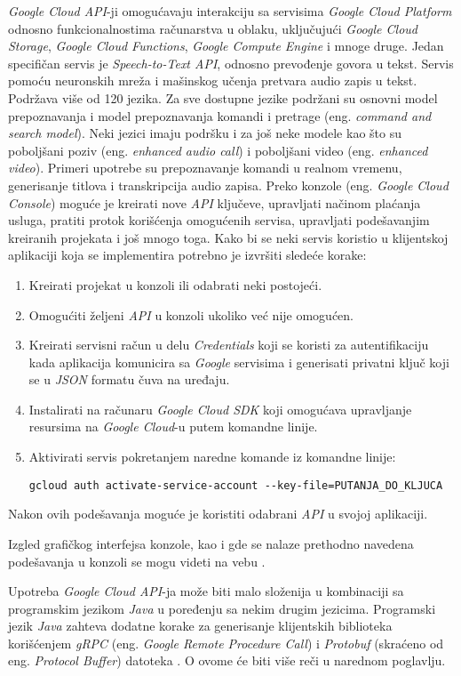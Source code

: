 \documentclass[android.tex]{subfiles}
\begin{document}
\textit{Google Cloud API}-ji omogućavaju interakciju sa servisima \textit{Google Cloud Platform} odnosno funkcionalnostima računarstva u oblaku, uključujući \textit{Google Cloud Storage}, \textit{Google Cloud Functions}, \textit{Google Compute Engine} i mnoge druge. Jedan specifičan servis je \textit{Speech-to-Text API}, odnosno prevođenje govora u tekst. Servis pomoću neuronskih mreža i mašinskog učenja pretvara audio zapis u tekst. Podržava više od 120 jezika. Za sve dostupne jezike podržani su osnovni model prepoznavanja i model prepoznavanja komandi i pretrage (eng. \textit{command and search model}). Neki jezici imaju podršku i za još neke modele kao što su poboljšani poziv (eng. \textit{enhanced audio call}) i poboljšani video (eng. \textit{enhanced video}). Primeri upotrebe su prepoznavanje komandi u realnom vremenu, generisanje titlova i transkripcija audio zapisa. Preko konzole (eng. \textit{Google Cloud Console}) moguće je kreirati nove \textit{API} ključeve, upravljati načinom plaćanja usluga, pratiti protok korišćenja omogućenih servisa, upravljati podešavanjim kreiranih projekata i još mnogo toga. Kako bi se neki servis koristio u klijentskoj aplikaciji koja se implementira potrebno je izvršiti sledeće korake: 
\begin{enumerate}
    \item Kreirati projekat u konzoli ili odabrati neki postojeći.
    \item Omogućiti željeni \textit{API} u konzoli ukoliko već nije omogućen. 
    \item Kreirati servisni račun u delu \textit{Credentials} koji se koristi za autentifikaciju kada aplikacija komunicira sa \textit{Google} servisima i generisati privatni ključ koji se u \textit{JSON} formatu čuva na uređaju.
    \item Instalirati na računaru \textit{Google Cloud SDK} koji omogućava upravljanje resursima na \textit{Google Cloud}-u putem komandne linije.
    \item Aktivirati servis pokretanjem naredne komande iz komandne linije:
    
    \verb|gcloud auth activate-service-account --key-file=PUTANJA_DO_KLJUCA|
\end{enumerate}
Nakon ovih podešavanja moguće je koristiti odabrani \textit{API} u svojoj aplikaciji.

Izgled grafičkog interfejsa  konzole, kao i gde se nalaze prethodno navedena podešavanja u konzoli se mogu videti na vebu \cite{sajt:googleConsole}.

Upotreba \textit{Google Cloud API}-ja može biti malo složenija u kombinaciji sa programskim jezikom \textit{Java} u poređenju sa nekim drugim jezicima. Programski jezik \textit{Java} zahteva dodatne korake za generisanje klijentskih biblioteka korišćenjem \textit{gRPC} (eng. \textit{Google Remote Procedure Call}) \cite{sajt:grpc} i \textit{Protobuf} (skraćeno od eng. \textit{Protocol Buffer}) datoteka \cite{sajt:protobufDev}. O ovome će biti više reči u narednom poglavlju.
\end{document}
